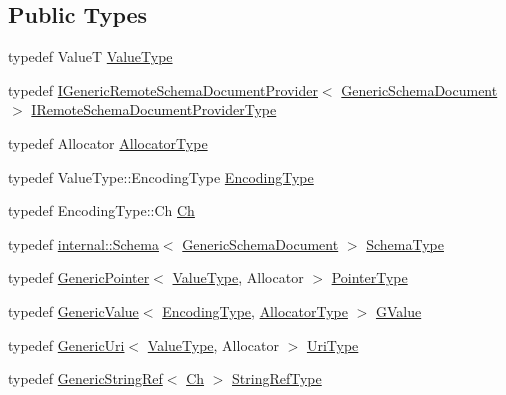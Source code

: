 \subsection*{Public Types}
\begin{DoxyCompactItemize}
\item 
typedef ValueT \hyperlink{classGenericSchemaDocument_ae246f1b6573a5a8a2c0d73d4eb64d53a}{Value\+Type}
\item 
typedef \hyperlink{classIGenericRemoteSchemaDocumentProvider}{I\+Generic\+Remote\+Schema\+Document\+Provider}$<$ \hyperlink{classGenericSchemaDocument}{Generic\+Schema\+Document} $>$ \hyperlink{classGenericSchemaDocument_aa53ca323efce50f88aea6fa0d03e9785}{I\+Remote\+Schema\+Document\+Provider\+Type}
\item 
typedef Allocator \hyperlink{classGenericSchemaDocument_ac0d88adf8c86917d8bc9563ffdab6a6d}{Allocator\+Type}
\item 
typedef Value\+Type\+::\+Encoding\+Type \hyperlink{classGenericSchemaDocument_ad0293c28c9ffe80ab1f8ec86efee35c8}{Encoding\+Type}
\item 
typedef Encoding\+Type\+::\+Ch \hyperlink{classGenericSchemaDocument_ab1dec56a78b29649eb8e4b85b101ec7c}{Ch}
\item 
typedef \hyperlink{classinternal_1_1Schema}{internal\+::\+Schema}$<$ \hyperlink{classGenericSchemaDocument}{Generic\+Schema\+Document} $>$ \hyperlink{classGenericSchemaDocument_acaf115202b159a2eb72c97c3dc6c3895}{Schema\+Type}
\item 
typedef \hyperlink{classGenericPointer}{Generic\+Pointer}$<$ \hyperlink{classGenericSchemaDocument_ae246f1b6573a5a8a2c0d73d4eb64d53a}{Value\+Type}, Allocator $>$ \hyperlink{classGenericSchemaDocument_aeb62f562d4dc024402b00f97cbcef747}{Pointer\+Type}
\item 
typedef \hyperlink{classGenericValue}{Generic\+Value}$<$ \hyperlink{classGenericSchemaDocument_ad0293c28c9ffe80ab1f8ec86efee35c8}{Encoding\+Type}, \hyperlink{classGenericSchemaDocument_ac0d88adf8c86917d8bc9563ffdab6a6d}{Allocator\+Type} $>$ \hyperlink{classGenericSchemaDocument_a777505b09fff6cf23b8cfed9e0350eec}{G\+Value}
\item 
typedef \hyperlink{classGenericUri}{Generic\+Uri}$<$ \hyperlink{classGenericSchemaDocument_ae246f1b6573a5a8a2c0d73d4eb64d53a}{Value\+Type}, Allocator $>$ \hyperlink{classGenericSchemaDocument_afcfefaab7eecec6849d478557392e23c}{Uri\+Type}
\item 
typedef \hyperlink{structGenericStringRef}{Generic\+String\+Ref}$<$ \hyperlink{classGenericSchemaDocument_ab1dec56a78b29649eb8e4b85b101ec7c}{Ch} $>$ \hyperlink{classGenericSchemaDocument_adc77ed1f500a224582385ff730de1aa3}{String\+Ref\+Type}
\end{DoxyCompactItemize}
